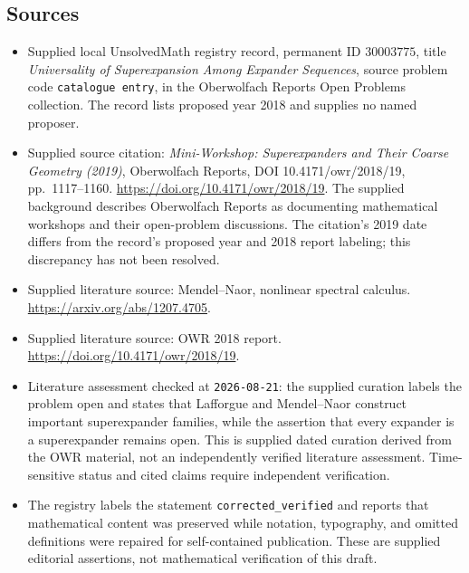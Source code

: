 \documentclass[11pt]{article}
\begin{document}
\subsection{Sources}
\begin{itemize}
\item Supplied local UnsolvedMath registry record, permanent ID \(30003775\), title \emph{Universality of Superexpansion Among Expander Sequences}, source problem code \texttt{catalogue entry}, in the Oberwolfach Reports Open Problems collection. The record lists proposed year 2018 and supplies no named proposer.
\item Supplied source citation: \emph{Mini-Workshop: Superexpanders and Their Coarse Geometry (2019)}, Oberwolfach Reports, DOI 10.4171/owr/2018/19, pp.\ 1117--1160. \url{https://doi.org/10.4171/owr/2018/19}. The supplied background describes Oberwolfach Reports as documenting mathematical workshops and their open-problem discussions. The citation's 2019 date differs from the record's proposed year and 2018 report labeling; this discrepancy has not been resolved.
\item Supplied literature source: Mendel--Naor, nonlinear spectral calculus. \url{https://arxiv.org/abs/1207.4705}.
\item Supplied literature source: OWR 2018 report. \url{https://doi.org/10.4171/owr/2018/19}.
\item Literature assessment checked at \texttt{2026-08-21}: the supplied curation labels the problem open and states that Lafforgue and Mendel--Naor construct important superexpander families, while the assertion that every expander is a superexpander remains open. This is supplied dated curation derived from the OWR material, not an independently verified literature assessment. Time-sensitive status and cited claims require independent verification.
\item The registry labels the statement \texttt{corrected\_verified} and reports that mathematical content was preserved while notation, typography, and omitted definitions were repaired for self-contained publication. These are supplied editorial assertions, not mathematical verification of this draft.
\end{itemize}
\end{document}
